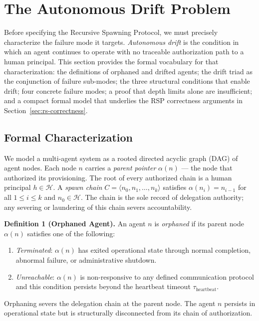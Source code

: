 \section{The Autonomous Drift Problem}
\label{sec:rs-drift}

Before specifying the Recursive Spawning Protocol, we must precisely characterize the failure mode it targets. \emph{Autonomous drift} is the condition in which an agent continues to operate with no traceable authorization path to a human principal. This section provides the formal vocabulary for that characterization: the definitions of orphaned and drifted agents; the drift triad as the conjunction of failure sub-modes; the three structural conditions that enable drift; four concrete failure modes; a proof that depth limits alone are insufficient; and a compact formal model that underlies the RSP correctness arguments in Section~\ref{sec:rs-correctness}.

\subsection{Formal Characterization}
\label{sec:rs-drift-formal}

We model a multi-agent system as a rooted directed acyclic graph (DAG) of agent nodes. Each node $n$ carries a \emph{parent pointer} $\alpha(n)$ — the node that authorized its provisioning. The root of every authorized chain is a human principal $h \in \mathcal{H}$. A \emph{spawn chain} $C = \langle n_0, n_1, \ldots, n_k \rangle$ satisfies $\alpha(n_i) = n_{i-1}$ for all $1 \leq i \leq k$ and $n_0 \in \mathcal{H}$. The chain is the sole record of delegation authority; any severing or laundering of this chain severs accountability.

\medskip
\noindent\textbf{Definition 1 (Orphaned Agent).}
An agent $n$ is \emph{orphaned} if its parent node $\alpha(n)$ satisfies one of the following:
\begin{enumerate}
  \item[(a)] \emph{Terminated}: $\alpha(n)$ has exited operational state through normal completion, abnormal failure, or administrative shutdown.
  \item[(b)] \emph{Unreachable}: $\alpha(n)$ is non-responsive to any defined communication protocol and this condition persists beyond the heartbeat timeout $\tau_{\mathrm{heartbeat}}$.
\end{enumerate}
Orphaning severs the delegation chain at the parent node. The agent $n$ persists in operational state but is structurally disconnected from its chain of authorization.

